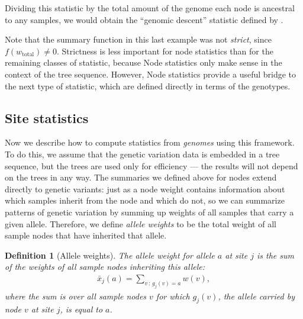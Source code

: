 \documentclass[9pt,twoside,lineno]{gsajnl}
\newcommand{\st}{\,\colon\,}
\newtheorem{definition}{Definition}
\newcommand{\iw}{w} %
\newcommand{\tiw}{w_\text{total}} %
\newcommand{\aw}{{\bar x}} %
\begin{document}
Dividing this statistic by the total amount of the genome each node is ancestral to any samples,
we would obtain the ``genomic descent'' statistic defined by \citet{scheib2019anglian}.

Note that the summary function in this last example was not \emph{strict}, since $f(\tiw) \neq 0$.
Strictness is less important for node statistics than for the remaining classes of statistic,
because Node statistics only make sense in the context of the tree sequence.
However, Node statistics provide a useful bridge to the next type of statistic,
which are defined directly in terms of the genotypes.


\subsection*{Site statistics}

Now we describe how to compute statistics from \emph{genomes} using this framework.
To do this, we assume that the genetic variation data is embedded in a tree sequence,
but the trees are used only for efficiency --- the results will not depend on
the trees in any way. The summaries we defined above for nodes
extend directly to genetic variants: just as a node weight contains information about
which samples inherit from the node and which do not,
so we can summarize patterns of genetic variation by summing up weights of all samples
that carry a given allele.
Therefore, we define \emph{allele weights} to be
the total weight of all sample nodes that have inherited that allele.

\begin{definition}[Allele weights]
    The \emph{allele weight} for allele $a$ at site $j$ is the sum of the weights
    of all sample nodes inheriting this allele:
    \begin{align*}
        \aw_j(a) = \sum_{v \st g_j(v) = a} \iw(v) ,
    \end{align*}
    where the sum is over all sample nodes $v$ for which
    $g_j(v)$, the allele carried by node $v$ at site $j$, is equal to $a$.
\end{definition}
\end{document}
